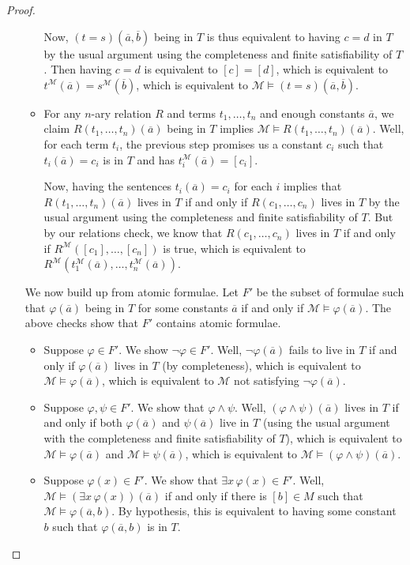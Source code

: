 \documentclass[../notes.tex]{subfiles}
\begin{document}
\begin{proof}
\begin{enumerate}
\begin{itemize}
			Now, $(t=s)(\overline a,\overline b)$ being in $T$ is thus equivalent to having $c=d$ in $T$ by the usual argument using the completeness and finite satisfiability of $T$. Then having $c=d$ is equivalent to $[c]=[d]$, which is equivalent to $t^\mathcal M(\overline a)=s^\mathcal M(\overline b)$, which is equivalent to $\mathcal M\models(t=s)(\overline a,\overline b)$.
			\item For any $n$-ary relation $R$ and terms $t_1,\ldots,t_n$ and enough constants $\overline a$, we claim $R(t_1,\ldots,t_n)(\overline a)$ being in $T$ implies $\mathcal M\models R(t_1,\ldots,t_n)(\overline a)$. Well, for each term $t_i$, the previous step promises us a constant $c_i$ such that $t_i(\overline a)=c_i$ is in $T$ and has $t_i^\mathcal M(\overline a)=[c_i]$.

			Now, having the sentences $t_i(\overline a)=c_i$ for each $i$ implies that $R(t_1,\ldots,t_n)(\overline a)$ lives in $T$ if and only if $R(c_1,\ldots,c_n)$ lives in $T$ by the usual argument using the completeness and finite satisfiability of $T$. But by our relations check, we know that $R(c_1,\ldots,c_n)$ lives in $T$ if and only if $R^\mathcal M([c_1],\ldots,[c_n])$ is true, which is equivalent to $R^\mathcal M\left(t_1^\mathcal M(\overline a),\ldots,t_n^\mathcal M(\overline a)\right)$.
		\end{itemize}
		We now build up from atomic formulae. Let $F'$ be the subset of formulae such that $\varphi(\overline a)$ being in $T$ for some constants $\overline a$ if and only if $\mathcal M\models\varphi(\overline a)$. The above checks show that $F'$ contains atomic formulae.
		\begin{itemize}
			\item Suppose $\varphi\in F'$. We show $\lnot\varphi\in F'$. Well, $\lnot\varphi(\overline a)$ fails to live in $T$ if and only if $\varphi(\overline a)$ lives in $T$ (by completeness), which is equivalent to $\mathcal M\models\varphi(\overline a)$, which is equivalent to $\mathcal M$ not satisfying $\lnot\varphi(\overline a)$.
			\item Suppose $\varphi,\psi\in F'$. We show that $\varphi\land\psi$. Well, $(\varphi\land\psi)(\overline a)$ lives in $T$ if and only if both $\varphi(\overline a)$ and $\psi(\overline a)$ live in $T$ (using the usual argument with the completeness and finite satisfiability of $T$), which is equivalent to $\mathcal M\models\varphi(\overline a)$ and $\mathcal M\models\psi(\overline a)$, which is equivalent to $\mathcal M\models(\varphi\land\psi)(\overline a)$.
			\item Suppose $\varphi(x)\in F'$. We show that $\exists x\,\varphi(x)\in F'$. Well, $\mathcal M\models(\exists x\,\varphi(x))(\overline a)$ if and only if there is $[b]\in M$ such that $\mathcal M\models\varphi(\overline a,b)$. By hypothesis, this is equivalent to having some constant $b$ such that $\varphi(\overline a,b)$ is in $T$.


\end{itemize}
\end{enumerate}
\end{proof}
\end{document}
